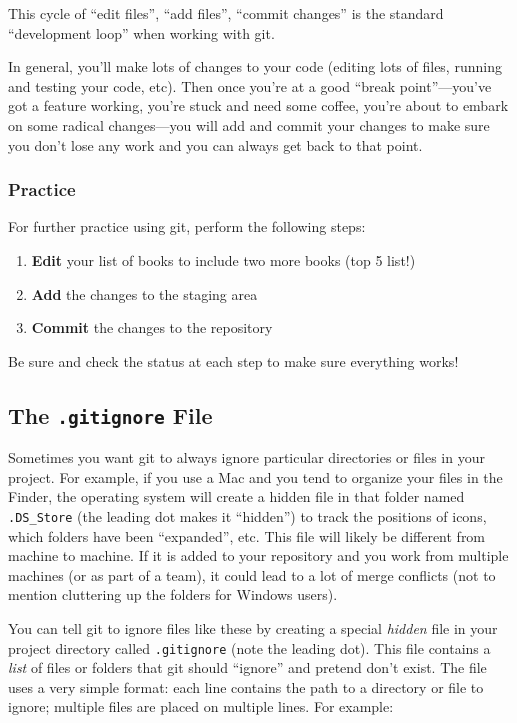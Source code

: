 \documentclass[]{book}
\providecommand{\tightlist}{%
  \setlength{\itemsep}{0pt}\setlength{\parskip}{0pt}}
\theoremstyle{definition}
\theoremstyle{definition}
\theoremstyle{remark}
\begin{document}
This cycle of ``edit files'', ``add files'', ``commit changes'' is the
standard ``development loop'' when working with git.

In general, you'll make lots of changes to your code (editing lots of
files, running and testing your code, etc). Then once you're at a good
``break point''---you've got a feature working, you're stuck and need
some coffee, you're about to embark on some radical changes---you will
add and commit your changes to make sure you don't lose any work and you
can always get back to that point.

\subsubsection{Practice}\label{practice}

For further practice using git, perform the following steps:

\begin{enumerate}
\def\labelenumi{\arabic{enumi}.}
\tightlist
\item
  \textbf{Edit} your list of books to include two more books (top 5
  list!)
\item
  \textbf{Add} the changes to the staging area
\item
  \textbf{Commit} the changes to the repository
\end{enumerate}

Be sure and check the status at each step to make sure everything works!

\subsection{\texorpdfstring{The \texttt{.gitignore}
File}{The .gitignore File}}\label{the-.gitignore-file}

Sometimes you want git to always ignore particular directories or files
in your project. For example, if you use a Mac and you tend to organize
your files in the Finder, the operating system will create a hidden file
in that folder named \texttt{.DS\_Store} (the leading dot makes it
``hidden'') to track the positions of icons, which folders have been
``expanded'', etc. This file will likely be different from machine to
machine. If it is added to your repository and you work from multiple
machines (or as part of a team), it could lead to a lot of merge
conflicts (not to mention cluttering up the folders for Windows users).

You can tell git to ignore files like these by creating a special
\emph{hidden} file in your project directory called \texttt{.gitignore}
(note the leading dot). This file contains a \emph{list} of files or
folders that git should ``ignore'' and pretend don't exist. The file
uses a very simple format: each line contains the path to a directory or
file to ignore; multiple files are placed on multiple lines. For
example:
\end{document}
